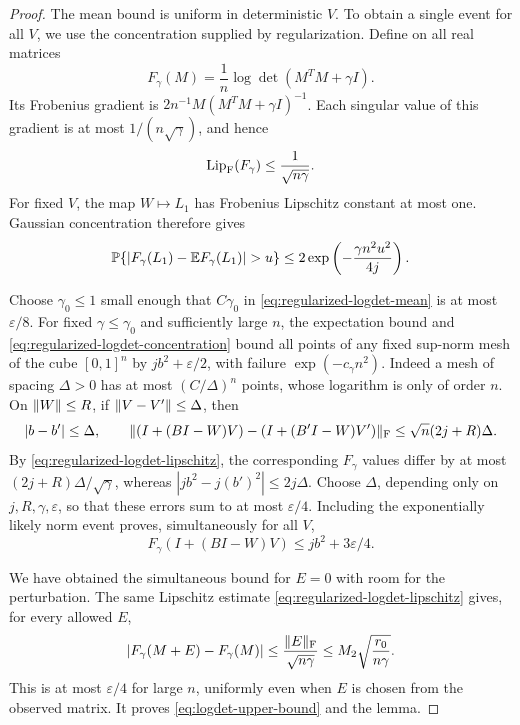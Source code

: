 \begin{proof}
The mean bound is uniform in deterministic $V$.  To obtain a
single event for all $V$, we use the concentration supplied by
regularization.  Define on all real matrices
\[
 F_\gamma(M)=\frac1n\log\det(M^TM+\gamma I).
\]
Its Frobenius gradient is
$2n^{-1}M(M^TM+\gamma I)^{-1}$.  Each singular value of this
gradient is at most $1/(n\sqrt\gamma)$, and hence
\begin{equation}\label{eq:regularized-logdet-lipschitz}
 \operatorname{Lip}_{\mathrm F}(F_\gamma)\le\frac1{\sqrt{n\gamma}}.
\end{equation}
For fixed $V$, the map $W\mapsto L_1$ has Frobenius Lipschitz
constant at most one.  Gaussian concentration therefore gives
\begin{equation}\label{eq:regularized-logdet-concentration}
 \Prob\{|F_\gamma(L_1)-\E F_\gamma(L_1)|>u\}
 \le2\exp\left(-\frac{\gamma n^2u^2}{4j}\right).
\end{equation}

Choose $\gamma_0\le1$ small enough that $C\gamma_0$ in
\eqref{eq:regularized-logdet-mean} is at most
$\varepsilon/8$.  For fixed $\gamma\le\gamma_0$ and sufficiently
large $n$, the expectation bound and
\eqref{eq:regularized-logdet-concentration} bound all points
of any fixed sup-norm mesh of the cube $[0,1]^n$ by
$jb^2+\varepsilon/2$, with failure $\exp(-c_\gamma n^2)$.
Indeed a mesh of spacing $\Delta>0$ has at most
$(C/\Delta)^n$ points, whose logarithm is only of order $n$.
On $\lVert W\rVert\le R$, if $\lVert V-V'\rVert\le\Delta$, then
\[
 |b-b'|\le\Delta,\qquad
 \lVert (I+(BI-W)V)-(I+(B'I-W)V')\rVert_{\mathrm F}
 \le\sqrt n(2j+R)\Delta.
\]
By \eqref{eq:regularized-logdet-lipschitz}, the corresponding
$F_\gamma$ values differ by at most
$(2j+R)\Delta/\sqrt\gamma$, whereas $|jb^2-j(b')^2|\le2j\Delta$.
Choose $\Delta$, depending only on
$j,R,\gamma,\varepsilon$, so that these errors sum to at most
$\varepsilon/4$.  Including the exponentially likely norm
event proves, simultaneously for all $V$,
\[
 F_\gamma(I+(BI-W)V)\le jb^2+3\varepsilon/4.
\]

We have obtained the simultaneous bound for $E=0$ with room for
the perturbation.  The same Lipschitz estimate
\eqref{eq:regularized-logdet-lipschitz} gives, for every allowed $E$,
\[
 |F_\gamma(M+E)-F_\gamma(M)|
 \le\frac{\lVert E\rVert_{\mathrm F}}{\sqrt{n\gamma}}
 \le M_2\sqrt{\frac{r_0}{n\gamma}}.
\]
This is at most $\varepsilon/4$ for large $n$, uniformly even
when $E$ is chosen from the observed matrix.  It proves
\eqref{eq:logdet-upper-bound} and the lemma.
\end{proof}
